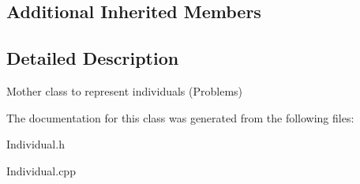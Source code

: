\subsection*{Additional Inherited Members}


\subsection{Detailed Description}
Mother class to represent individuals (Problems) 

The documentation for this class was generated from the following files\+:\begin{DoxyCompactItemize}
\item 
Individual.\+h\item 
Individual.\+cpp\end{DoxyCompactItemize}
